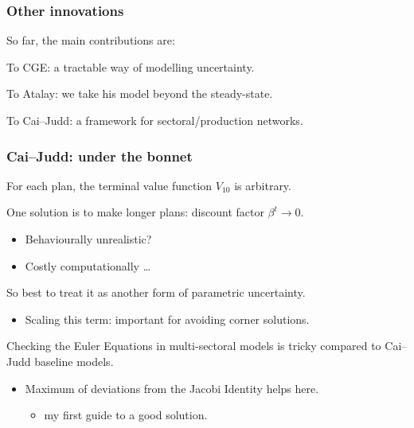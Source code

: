 \documentclass[handout,english]{beamer}
\begin{document}
\begin{frame}
  \frametitle{Other innovations}
So far, the main contributions are:

To CGE: a tractable way of modelling uncertainty.

To Atalay: we take his model beyond the steady-state.

To Cai--Judd: a framework for sectoral/production networks.

\end{frame}
\begin{frame}
  \frametitle{Cai--Judd: under the bonnet}
  For each plan, the terminal value function $V_{10}$ is arbitrary.

  One solution is to make longer plans: discount factor 
    $\beta^t \rightarrow 0$.
    \begin{itemize}
      \item Behaviourally unrealistic?
      \item Costly computationally \dots
    \end{itemize}
  So best to treat it as another form of parametric uncertainty.
    \begin{itemize}
      \item Scaling this term: important for avoiding corner solutions.
    \end{itemize}
  Checking the Euler Equations in multi-sectoral models is tricky compared to
  Cai--Judd baseline models.
    \begin{itemize}
      \item Maximum of deviations from the Jacobi Identity helps here.
        \begin{itemize}
          \item my first guide to a good solution.
        \end{itemize}
    \end{itemize}
\end{frame}
\end{document}
